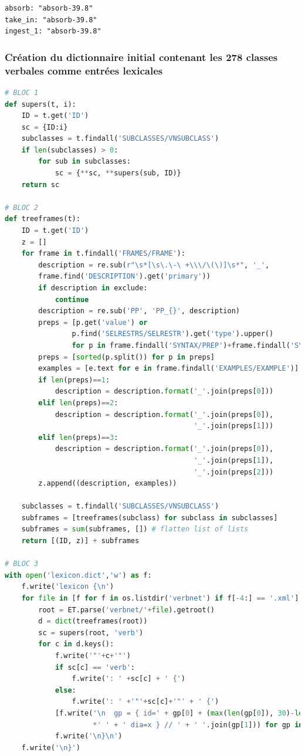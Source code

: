 \begin{lstlisting}[language=XML]
absorb: "absorb-39.8"
take_in: "absorb-39.8"
ingest_1: "absorb-39.8"
\end{lstlisting}

\subsubsection{Création du dictionnaire initial contenant les 278 classes verbales comme entrées lexicales}

\begin{lstlisting}[language=Python, caption = code pour lexicon.dict]
# BLOC 1
def supers(t, i):
    ID = t.get('ID')
    sc = {ID:i}
    subclasses = t.findall('SUBCLASSES/VNSUBCLASS')
    if len(subclasses) > 0:
        for sub in subclasses:
            sc = {**sc, **supers(sub, ID)}
    return sc
		
# BLOC 2
def treeframes(t):
    ID = t.get('ID')
    z = []
    for frame in t.findall('FRAMES/FRAME'):
        description = re.sub(r"\s*[\s\.\-\ +\\\/\(\)]\s*", '_', 
        frame.find('DESCRIPTION').get('primary'))
        if description in exclude:
            continue
        description = re.sub('PP', 'PP_{}', description)
        preps = [p.get('value') or 
                p.find('SELRESTRS/SELRESTR').get('type').upper() 
                for p in frame.findall('SYNTAX/PREP')+frame.findall('SYNTAX/LEX')]
        preps = [sorted(p.split()) for p in preps]     
        examples = [e.text for e in frame.findall('EXAMPLES/EXAMPLE')]
        if len(preps)==1:
            description = description.format('_'.join(preps[0]))
        elif len(preps)==2:
            description = description.format('_'.join(preps[0]),
                                             '_'.join(preps[1]))
        elif len(preps)==3:
            description = description.format('_'.join(preps[0]), 
                                             '_'.join(preps[1]), 
                                             '_'.join(preps[2]))
        z.append((description, examples))
        
    subclasses = t.findall('SUBCLASSES/VNSUBCLASS')
    subframes = [treeframes(subclass) for subclass in subclasses]
    subframes = sum(subframes, []) # flatten list of lists
    return [(ID, z)] + subframes
		
# BLOC 3
with open('lexicon.dict','w') as f:
    f.write('lexicon {\n')
    for file in [f for f in os.listdir('verbnet') if f[-4:] == '.xml']:
        root = ET.parse('verbnet/'+file).getroot()       
        d = dict(treeframes(root))
        sc = supers(root, 'verb')
        for c in d.keys():
            f.write('"'+c+'"')
            if sc[c] == 'verb':
                f.write(': ' +sc[c] + ' {')
            else:
                f.write(': ' +'"'+sc[c]+'"' + ' {')
            [f.write('\n  gp = { id=' + gp[0] + (max(len(gp[0]), 30)-len(gp[0]))
                     *' ' + ' dia=x } // ' + ' '.join(gp[1])) for gp in d[c]]
            f.write('\n}\n')
    f.write('\n}')
\end{lstlisting}

